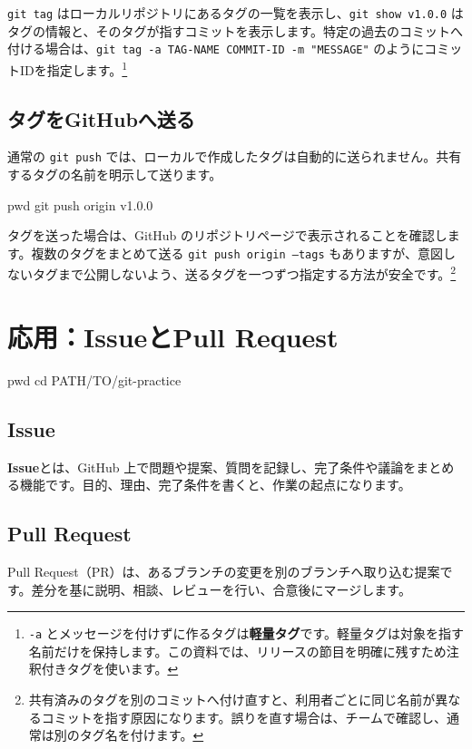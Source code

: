 \documentclass[a4paper,11pt]{jlreq}
\newcommand{\cmd}[1]{\texttt{#1}}
\newcommand{\term}[1]{\textbf{#1}}
\begin{document}
\cmd{git tag} はローカルリポジトリにあるタグの一覧を表示し、\cmd{git show v1.0.0} はタグの情報と、そのタグが指すコミットを表示します。特定の過去のコミットへ付ける場合は、\cmd{git tag -a TAG-NAME COMMIT-ID -m "MESSAGE"} のようにコミットIDを指定します。\footnote{\cmd{-a} とメッセージを付けずに作るタグは\term{軽量タグ}です。軽量タグは対象を指す名前だけを保持します。この資料では、リリースの節目を明確に残すため注釈付きタグを使います。}

\subsection{タグをGitHubへ送る}

通常の \cmd{git push} では、ローカルで作成したタグは自動的に送られません。共有するタグの名前を明示して送ります。

\begin{codeblock}
pwd
git push origin v1.0.0
\end{codeblock}

タグを送った場合は、GitHub のリポジトリページで表示されることを確認します。複数のタグをまとめて送る \cmd{git push origin --tags} もありますが、意図しないタグまで公開しないよう、送るタグを一つずつ指定する方法が安全です。\footnote{共有済みのタグを別のコミットへ付け直すと、利用者ごとに同じ名前が異なるコミットを指す原因になります。誤りを直す場合は、チームで確認し、通常は別のタグ名を付けます。}

\section{応用：IssueとPull Request}

\begin{codeblock}
pwd
cd PATH/TO/git-practice
\end{codeblock}

\subsection{Issue}

\term{Issue}とは、GitHub 上で問題や提案、質問を記録し、完了条件や議論をまとめる機能です。目的、理由、完了条件を書くと、作業の起点になります。

\subsection{Pull Request}

Pull Request（PR）は、あるブランチの変更を別のブランチへ取り込む提案です。差分を基に説明、相談、レビューを行い、合意後にマージします。
\end{document}
